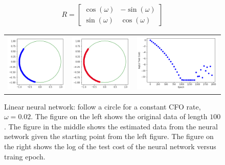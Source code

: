 \begin{align}
R = \begin{bmatrix}
\cos(\omega) & - \sin(\omega) \\
\sin(\omega) & \cos(\omega)
\end{bmatrix}
\end{align} 

\setlength{\tabcolsep}{0pt}
\begin{figure}
  \centering
  \caption{Linear neural network: follow a circle for a constant CFO rate, $\omega=0.02$. The figure on the left shows the original data of length $100$. The figure in the middle shows the estimated data from the neural network given the starting point from the left figure.  The figure on the right shows the log of the test cost of the neural network versus traing epoch.}
  \begin{tabular}{ccc}
    \includegraphics[width=50mm]{figures/cfo/follow_circle_linear_before.png}&
    \includegraphics[width=50mm]{figures/cfo/follow_circle_linear_after.png}&
    \includegraphics[width=70mm]{figures/cfo/follow_circle_linear_loss.png}\\
  \end{tabular}
  \label{fig:circle_constant_rate}
\end{figure}

